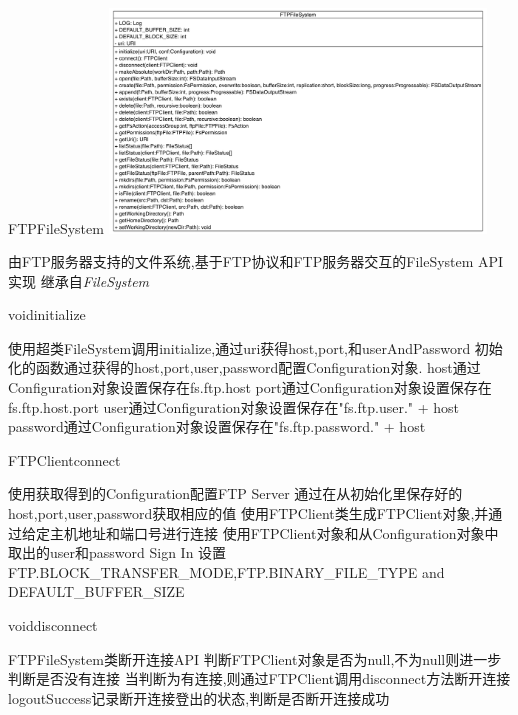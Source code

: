 \begin{XeClass}{FTPFileSystem}
\includegraphics[width=10cm]{cdig/FTPFileSystem.png}
     
 由FTP服务器支持的文件系统,基于FTP协议和FTP服务器交互的FileSystem API实现
 继承自\emph{FileSystem}

    \begin{XeMethod}{\XePublic}{void}{initialize}
         
 使用超类FileSystem调用initialize,通过uri获得host,port,和userAndPassword
 初始化的函数通过获得的host,port,user,password配置Configuration对象.
 host通过Configuration对象设置保存在fs.ftp.host
 port通过Configuration对象设置保存在fs.ftp.host.port
 user通过Configuration对象设置保存在"fs.ftp.user." + host
 password通过Configuration对象设置保存在"fs.ftp.password." + host

    \end{XeMethod}

    \begin{XeMethod}{\XePrivate}{FTPClient}{connect}
         
 使用获取得到的Configuration配置FTP Server
 通过在从初始化里保存好的host,port,user,password获取相应的值
 使用FTPClient类生成FTPClient对象,并通过给定主机地址和端口号进行连接
 使用FTPClient对象和从Configuration对象中取出的user和password Sign In
 设置FTP.BLOCK_TRANSFER_MODE,FTP.BINARY_FILE_TYPE and DEFAULT_BUFFER_SIZE

    \end{XeMethod}

    \begin{XeMethod}{\XePrivate}{void}{disconnect}
         
 FTPFileSystem类断开连接API
 判断FTPClient对象是否为null,不为null则进一步判断是否没有连接
 当判断为有连接,则通过FTPClient调用disconnect方法断开连接
 logoutSuccess记录断开连接登出的状态,判断是否断开连接成功

    \end{XeMethod}


\end{XeClass}
